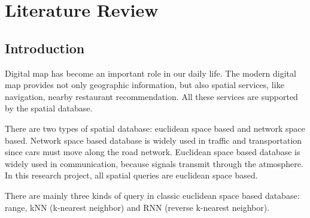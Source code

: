 \chapter{Literature Review}
\section{Introduction}
Digital map has become an important role in our daily life. The modern digital map provides not only
geographic information, but also spatial services, like navigation, nearby restaurant
recommendation. All these services are supported by the spatial database.

There are two types of spatial database: euclidean space based and network space based. Network
space based database is widely used in traffic and transportation since cars must move
along the road network. Euclidean space based database is widely used in communication, because
signals transmit through the atmosphere. In this research project, all spatial queries
are euclidean space based.

There are mainly three kinds of query in classic
euclidean space based database: range, kNN (k-nearest neighbor) and RNN (reverse k-nearest neighbor).

